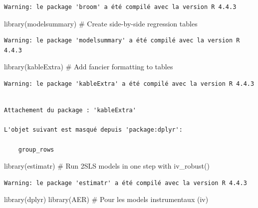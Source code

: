 \documentclass[
  letterpaper,
  DIV=11,
  numbers=noendperiod]{scrartcl}
\newenvironment{Shaded}{\begin{snugshade}}{\end{snugshade}}
\newcommand{\CommentTok}[1]{\textcolor[rgb]{0.37,0.37,0.37}{#1}}
\newcommand{\FunctionTok}[1]{\textcolor[rgb]{0.28,0.35,0.67}{#1}}
\newcommand{\NormalTok}[1]{\textcolor[rgb]{0.00,0.23,0.31}{#1}}
\begin{document}
\begin{verbatim}
Warning: le package 'broom' a été compilé avec la version R 4.4.3
\end{verbatim}

\begin{Shaded}
\begin{Highlighting}[]
\FunctionTok{library}\NormalTok{(modelsummary)  }\CommentTok{\# Create side{-}by{-}side regression tables}
\end{Highlighting}
\end{Shaded}

\begin{verbatim}
Warning: le package 'modelsummary' a été compilé avec la version R 4.4.3
\end{verbatim}

\begin{Shaded}
\begin{Highlighting}[]
\FunctionTok{library}\NormalTok{(kableExtra)  }\CommentTok{\# Add fancier formatting to tables}
\end{Highlighting}
\end{Shaded}

\begin{verbatim}
Warning: le package 'kableExtra' a été compilé avec la version R 4.4.3
\end{verbatim}

\begin{verbatim}

Attachement du package : 'kableExtra'

L'objet suivant est masqué depuis 'package:dplyr':

    group_rows
\end{verbatim}

\begin{Shaded}
\begin{Highlighting}[]
\FunctionTok{library}\NormalTok{(estimatr)  }\CommentTok{\# Run 2SLS models in one step with iv\_robust()}
\end{Highlighting}
\end{Shaded}

\begin{verbatim}
Warning: le package 'estimatr' a été compilé avec la version R 4.4.3
\end{verbatim}

\begin{Shaded}
\begin{Highlighting}[]
\FunctionTok{library}\NormalTok{(dplyr)}
\FunctionTok{library}\NormalTok{(AER) }\CommentTok{\# Pour les models instrumentaux (iv)}
\end{Highlighting}
\end{Shaded}
\end{document}
